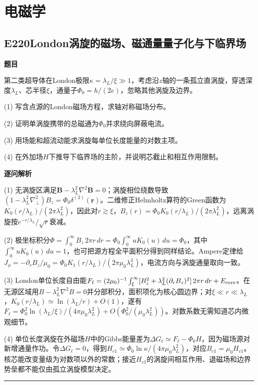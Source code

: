 \documentclass[UTF8,a4paper,11pt,oneside,openany]{ctexbook}
\begin{document}
\chapter{电磁学}
\section*{E220\quad London涡旋的磁场、磁通量量子化与下临界场}
\textbf{题目}\par
第二类超导体在London极限$\kappa=\lambda_L/\xi\gg1$，考虑沿$z$轴的一条孤立直涡旋，穿透深度$\lambda_L$、芯半径$\xi$，通量子$\Phi_0=h/(2e)$，忽略其他涡旋及边界。
\par\smallskip\noindent (1) 写含点源的London磁场方程，求轴对称磁场分布。
\par\smallskip\noindent (2) 证明单涡旋携带的总磁通为$\Phi_0$并求绕向屏蔽电流。
\par\smallskip\noindent (3) 用场能和超流动能求涡旋每单位长度能量的对数主项。
\par\smallskip\noindent (4) 在外加场$H$下推导下临界场的主阶，并说明芯截止和相互作用限制。
\par\medskip\textbf{逐问解析}\par
\par\smallskip\noindent (1) 无涡旋区满足$\boldsymbol B-\lambda_L^2\nabla^2\boldsymbol B=0$；涡旋相位绕数导致$(1-\lambda_L^2\nabla_\perp^2)B_z=\Phi_0\delta^{(2)}(\boldsymbol r)$。二维修正Helmholtz算符的Green函数为$K_0(r/\lambda_L)/(2\pi\lambda_L^2)$，因此对$r\gtrsim\xi$，$B_z(r)=\Phi_0 K_0(r/\lambda_L)/(2\pi\lambda_L^2)$，远离涡旋按$e^{-r/\lambda_L}/\sqrt r$衰减。
\par\smallskip\noindent (2) 极坐标积分$\Phi=\int_0^\infty B_z\,2\pi r\,dr=\Phi_0\int_0^\infty uK_0(u)\,du=\Phi_0$，其中$\int_0^\infty uK_0(u)\,du=1$，也可把源方程全平面积分得到同样结论。Ampere定律给$J_\phi=-\partial_rB_z/\mu_0=\Phi_0 K_1(r/\lambda_L)/(2\pi\mu_0\lambda_L^3)$，电流方向与涡旋通量取向一致。
\par\smallskip\noindent (3) London单位长度自由能$F_\ell=(2\mu_0)^{-1}\int_\xi^\infty[B_z^2+\lambda_L^2(\partial_rB_z)^2]\,2\pi r\,dr+E_{\rm core}$。在无源区域用$B-\lambda_L^2\nabla^2B=0$并分部积分，面积项化为核心圆边界；对$\xi\ll r\ll\lambda_L$，$K_0(r/\lambda_L)\simeq\ln(\lambda_L/r)+O(1)$，遂有$F_\ell=\Phi_0^2\ln(\lambda_L/\xi)/(4\pi\mu_0\lambda_L^2)+O(\Phi_0^2/(\mu_0\lambda_L^2))$。对数系数无需知道芯内微观细节。
\par\smallskip\noindent (4) 单位长度涡旋在外磁场$H$中的Gibbs能量差为$\Delta G_\ell\simeq F_\ell-\Phi_0H$，因为磁场源对新增通量作功。令$\Delta G_\ell=0$，得到$H_{c1}\simeq\Phi_0\ln\kappa/(4\pi\mu_0\lambda_L^2)$，对应$B_{c1}=\mu_0H_{c1}$。核芯能改变量级为对数项以外的常数；接近$H_{c1}$的涡旋间相互作用、退磁场和边界势垒都不能仅由孤立涡旋模型决定。
\par\medskip\hrule\medskip
\end{document}
